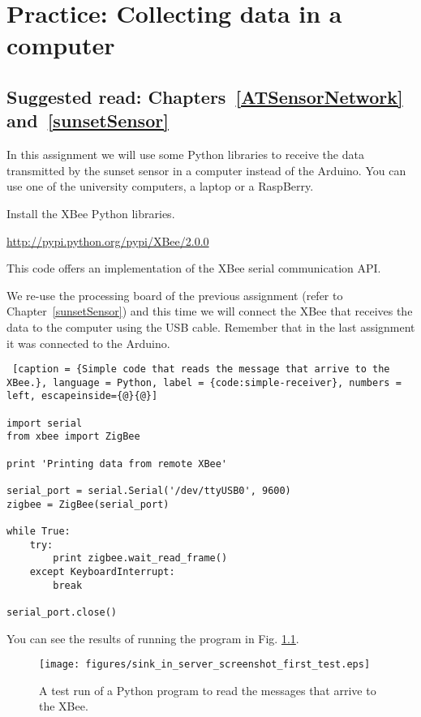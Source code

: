 \chapter{Practice: Collecting data in a computer}
\label{cha:sink-in-server}
\section*{Suggested read: Chapters~\ref{ATSensorNetwork} and~\ref{sunsetSensor}}

In this assignment we will use some Python libraries to receive the data transmitted by the sunset sensor in a computer instead of the Arduino.
You can use one of the university computers, a laptop or a RaspBerry.

Install the XBee Python libraries.

\url{http://pypi.python.org/pypi/XBee/2.0.0}

This code offers an implementation of the XBee serial communication API.

We re-use the processing board of the previous assignment (refer to Chapter~\ref{sunsetSensor}) and this time we will connect the XBee that receives the data to the computer using the USB cable.
Remember that in the last assignment it was connected to the Arduino.

\begin{lstlisting} [caption = {Simple code that reads the message that arrive to the XBee.}, language = Python, label = {code:simple-receiver}, numbers = left, escapeinside={@}{@}]

import serial
from xbee import ZigBee

print 'Printing data from remote XBee'

serial_port = serial.Serial('/dev/ttyUSB0', 9600)
zigbee = ZigBee(serial_port)

while True:
    try:
        print zigbee.wait_read_frame()
    except KeyboardInterrupt:
        break

serial_port.close()
\end{lstlisting}

You can see the results of running the program in Fig. \ref{fig:sink_in_server_screenshot_first_test}.

\begin{figure}[htbp]
  \centering
  \texttt{[image: figures/sink\_in\_server\_screenshot\_first\_test.eps]}
  \caption{A test run of a Python program to read the messages that arrive to the XBee.}
  \label{fig:sink_in_server_screenshot_first_test}
\end{figure}


